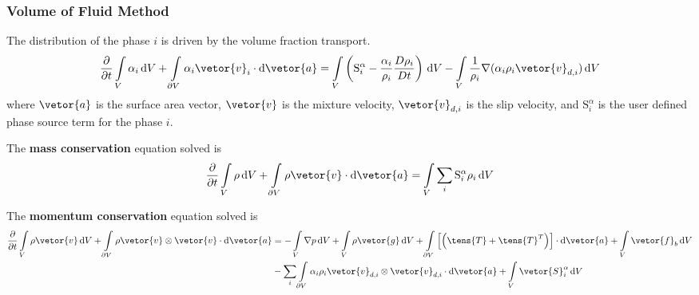 \subsubsection{Volume of Fluid Method}
The distribution of the phase $i$ is driven by the volume fraction transport.
\begin{equation}\label{eq_vof_transport}
\frac{\partial}{\partial t}\int\limits_{V} \alpha_{i}\,\mathrm{d}V +
\int\limits_{\partial V} \alpha_{i} \vetor{v}_{i} \cdot \mathrm{d}\vetor{a}
= \int\limits_{V}\left(\mathrm{S}^{\alpha}_{i} - \frac{\alpha_{i}}{\rho_{i}} \frac{D \rho_{i}}{D t}\right)\,\mathrm{d}V
- \int\limits_{V} \frac{1}{\rho_{i}}\nabla (\alpha_{i}\rho_{i}\vetor{v}_{d,i})\,\mathrm{d}V
\end{equation}
\noindent where $\vetor{a}$ is the surface area vector, $\vetor{v}$ is the mixture velocity, $\vetor{v}_{d,i}$ is the slip velocity, and
$\mathrm{S}^{\alpha}_{i}$ is the user defined phase source term for the phase $i$.


The \textbf{mass conservation} equation solved is
\begin{equation}\label{eq_vof_mass}
\frac{\partial}{\partial t}\int\limits_{V} \rho\,\mathrm{d}V +
\int\limits_{\partial V} \rho \vetor{v} \cdot \mathrm{d}\vetor{a}
= \int\limits_{V} \sum_{i}\mathrm{S}^{\alpha}_{i} \rho_{i}\,\mathrm{d}V
\end{equation}


The \textbf{momentum conservation} equation solved is
\begin{equation}\label{eq_vof_mom}
\begin{split}
\frac{\partial}{\partial t}\int\limits_{V} \rho \vetor{v}\,\mathrm{d}V +
\int\limits_{\partial V} \rho\vetor{v} \otimes \vetor{v} \cdot \mathrm{d}\vetor{a}
&= -\int\limits_{V} \nabla p\,\mathrm{d}V + \int\limits_{V} \rho \vetor{g}\,\mathrm{d}V
+ \int\limits_{\partial V}\left[\left(\tens{T} + \tens{T}^{T}\right)\right]\cdot \mathrm{d}\vetor{a} 
 + \int\limits_{V} \vetor{f}_{b}\,\mathrm{d}V\\
& - \sum_{i}\int\limits_{\partial V} \alpha_{i} \rho_{i} \vetor{v}_{d,i} \otimes \vetor{v}_{d,i} \cdot \mathrm{d}\vetor{a}
 + \int\limits_{V}\vetor{S}^{\alpha}_{i}\,\mathrm{d}V
\end{split}
\end{equation}

